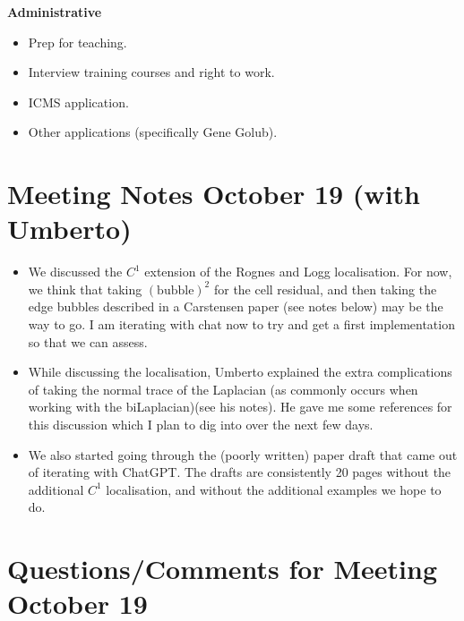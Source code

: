 \documentclass[12pt,a4paper]{article}
\begin{document}
\textbf{Administrative}

\begin{itemize}
    \item Prep for teaching.
    \item Interview training courses and right to work. 
    \item ICMS application.
    \item Other applications (specifically Gene Golub). 
\end{itemize}


\section{Meeting Notes October 19 (with Umberto)}


\begin{itemize}
    \item We discussed the $C^1$ extension of the Rognes and Logg localisation. For now, we think that taking $(\text{bubble})^2$ for the cell residual, and then taking the edge bubbles described in a Carstensen paper (see notes below) may be the way to go. I am iterating with chat now to try and get a first implementation so that we can assess.
    \item While discussing the localisation, Umberto explained the extra complications of taking the normal trace of the Laplacian (as commonly occurs when working with the biLaplacian)(see his notes). He gave me some references for this discussion which I plan to dig into over the next few days. 
    \item We also started going through the (poorly written) paper draft that came out of iterating with ChatGPT. The drafts are consistently 20 pages without the additional $C^1$ localisation, and without the additional examples we hope to do.
\end{itemize}



\newpage


\section{Questions/Comments for Meeting October 19}

\end{document}
